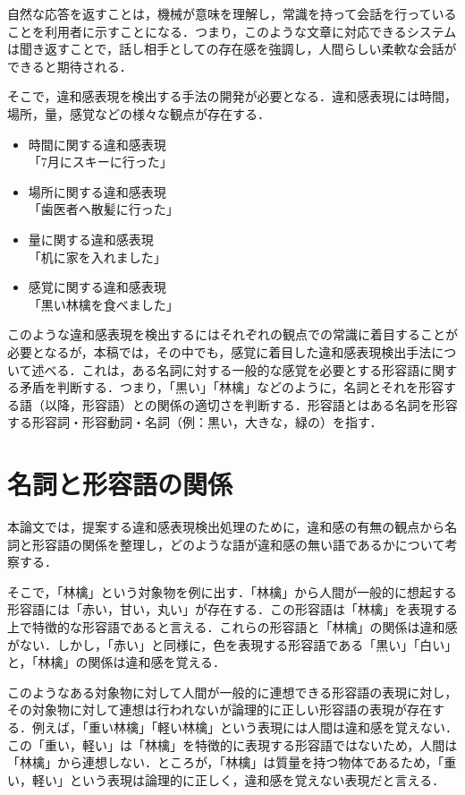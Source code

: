 \documentclass[japanese]{jnlp_1.4}
\begin{document}
自然な応答を返すことは，機械が意味を理解し，常識を持って会話を行っていることを利用者に示すことになる．つまり，このような文章に対応できるシステムは聞き返すことで，話し相手としての存在感を強調し，人間らしい柔軟な会話ができると期待される．

そこで，違和感表現を検出する手法の開発が必要となる．違和感表現には時間，場所，量，感覚などの様々な観点が存在する．
	\begin{itemize}
		\item \label{item:time} 時間に関する違和感表現\\
			「7月にスキーに行った」
		\item \label{item:basyo} 場所に関する違和感表現\\
			「歯医者へ散髪に行った」
		\item \label{item:ryo} 量に関する違和感表現\\
			「机に家を入れました」
		\item \label{item:kankaku} 感覚に関する違和感表現\\
			「黒い林檎を食べました」
	\end{itemize} 
このような違和感表現を検出するにはそれぞれの観点での常識に着目することが必要となるが，本稿では，その中でも，感覚に着目した違和感表現検出手法について述べる．これは，ある名詞に対する一般的な感覚を必要とする形容語に関する矛盾を判断する．つまり，「黒い」「林檎」などのように，名詞とそれを形容する語（以降，形容語）との関係の適切さを判断する．形容語とはある名詞を形容する形容詞・形容動詞・名詞（例：黒い，大きな，緑の）を指す．



\section{名詞と形容語の関係}\label{sec:bunrui}
本論文では，提案する違和感表現検出処理のために，違和感の有無の観点から名詞と形容語の関係を整理し，どのような語が違和感の無い語であるかについて考察する．

そこで，「林檎」という対象物を例に出す．「林檎」から人間が一般的に想起する形容語には「赤い，甘い，丸い」が存在する．この形容語は「林檎」を表現する上で特徴的な形容語であると言える．これらの形容語と「林檎」の関係は違和感がない．しかし，「赤い」と同様に，色を表現する形容語である「黒い」「白い」と，「林檎」の関係は違和感を覚える．

このようなある対象物に対して人間が一般的に連想できる形容語の表現に対し，その対象物に対して連想は行われないが論理的に正しい形容語の表現が存在する．例えば，「重い林檎」「軽い林檎」という表現には人間は違和感を覚えない．この「重い，軽い」は「林檎」を特徴的に表現する形容語ではないため，人間は「林檎」から連想しない．ところが，「林檎」は質量を持つ物体であるため，「重い，軽い」という表現は論理的に正しく，違和感を覚えない表現だと言える．
\end{document}
